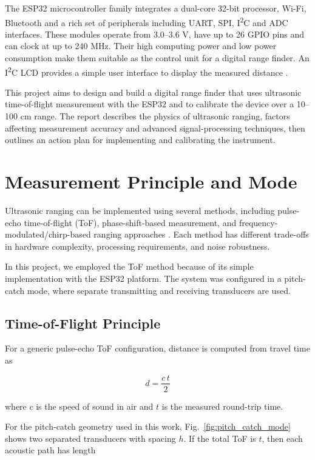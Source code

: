 \documentclass[10pt, conference, compsocconf]{IEEEtran}
\begin{document}
The ESP32 microcontroller family integrates a dual-core 32-bit processor, Wi-Fi, Bluetooth and a rich set of peripherals including UART, SPI, I\textsuperscript{2}C and ADC interfaces. These modules operate from 3.0--3.6 V, have up to 26 GPIO pins and can clock at up to 240 MHz. Their high computing power and low power consumption make them suitable as the control unit for a digital range finder. An I\textsuperscript{2}C LCD provides a simple user interface to display the measured distance \cite{esp32_datasheet}.

This project aims to design and build a digital range finder that uses ultrasonic time-of-flight measurement with the ESP32 and to calibrate the device over a 10--100 cm range. The report describes the physics of ultrasonic ranging, factors affecting measurement accuracy and advanced signal-processing techniques, then outlines an action plan for implementing and calibrating the instrument.

\section{Measurement Principle and Mode}

Ultrasonic ranging can be implemented using several methods,
including pulse-echo time-of-flight (ToF), phase-shift-based
measurement, and frequency-modulated/chirp-based ranging
approaches \cite{mi13040520}. Each method has different
trade-offs in hardware complexity, processing requirements,
and noise robustness.

In this project, we employed the ToF method because of its
simple implementation with the ESP32 platform. The system
was configured in a pitch-catch mode, where separate
transmitting and receiving transducers are used.

\subsection{Time-of-Flight Principle}

For a generic pulse-echo ToF configuration, distance is
computed from travel time as

\begin{equation}
d = \frac{c\,t}{2}
\end{equation}

where $c$ is the speed of sound in air and $t$ is the measured
round-trip time.

For the pitch-catch geometry used in this work,
Fig.~\ref{fig:pitch_catch_mode} shows two separated
transducers with spacing $h$. If the total ToF is $t$, then each
acoustic path has length
\end{document}
